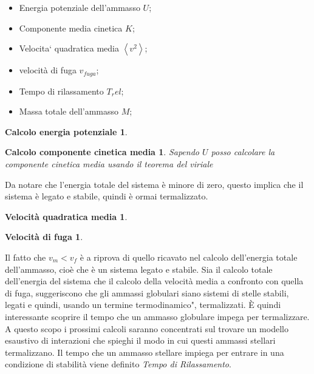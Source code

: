 \begin{itemize}
	\item Energia potenziale dell'ammasso $U$;
	\item Componente media cinetica $K$;
	\item Velocita` quadratica media $\left\langle v^2 \right\rangle$;
	\item velocit\`a di fuga $v_{fuga}$;
	\item Tempo di rilassamento $T_rel$;
	\item Massa totale dell'ammasso $M$;
\end{itemize}
\newtheorem*{mydef3}{Calcolo energia potenziale}
\begin{mydef3}
\end{mydef3}

\newtheorem*{mydef4}{Calcolo componente cinetica media}
\begin{mydef4}
Sapendo $U$ posso calcolare la componente cinetica media usando il teorema del viriale
\end{mydef4}
Da notare che l'energia totale del sistema \`e minore di zero, questo implica che il sistema \`e legato e stabile, quindi \`e ormai termalizzato.

\newtheorem*{mydef5}{Velocit\`a quadratica media}
\begin{mydef5}
\end{mydef5}

\newtheorem*{mydef6}{Velocit\`a di fuga}
\begin{mydef6}
\end{mydef6}
Il fatto che $v_m < v_f$ \`e a riprova di quello ricavato nel calcolo dell'energia totale dell'ammasso, cio\`e che \`e un sistema legato e stabile. Sia il calcolo totale dell'energia del sistema che il calcolo della velocit\`a media a confronto con quella di fuga, suggeriscono che gli ammassi globulari siano sistemi di stelle stabili, legati e quindi, usando un termine termodinamico", termalizzati. \`E quindi interessante scoprire il tempo che un ammasso globulare impega per termalizzare. A questo scopo i prossimi calcoli saranno concentrati sul trovare un modello esaustivo di interazioni che spieghi il modo in cui questi ammassi stellari termalizzano. Il tempo che un ammasso stellare impiega per entrare in una condizione di stabilit\`a viene definito \emph{Tempo di Rilassamento}.

